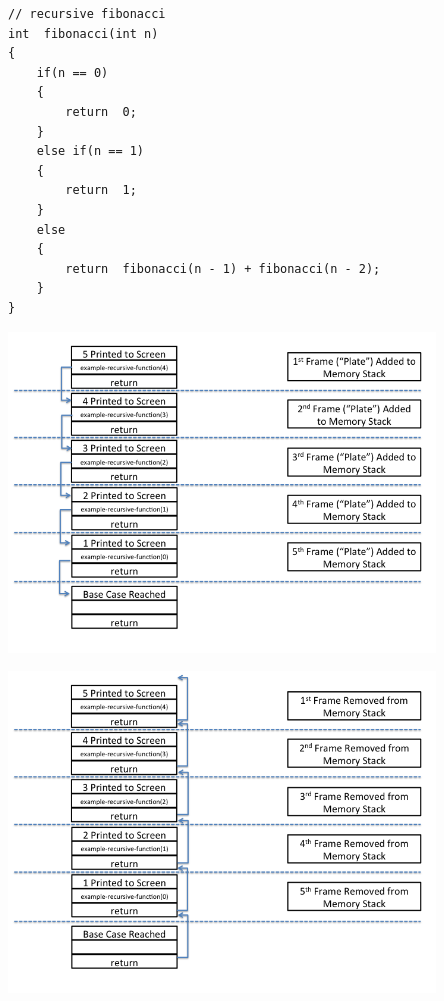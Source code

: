 \documentclass{beamer}
\begin{document}
\begin{frame}[fragile]
\begin{block}{}
\begin{lstlisting}
// recursive fibonacci 
int  fibonacci(int n)
{
    if(n == 0)
    {
        return  0;
    }
    else if(n == 1)
    {
        return  1;
    }
    else
    {
        return  fibonacci(n - 1) + fibonacci(n - 2);
    }
}
\end{lstlisting}
\end{block}
\end{frame}

\begin{frame}
\begin{center}
\includegraphics[height=8.5cm,keepaspectratio]{images/stack2}
\end{center}
\end{frame}

\begin{frame}
\begin{center}
\includegraphics[height=8.5cm,keepaspectratio]{images/stack3}
\end{center}
\end{frame}
\end{document}

